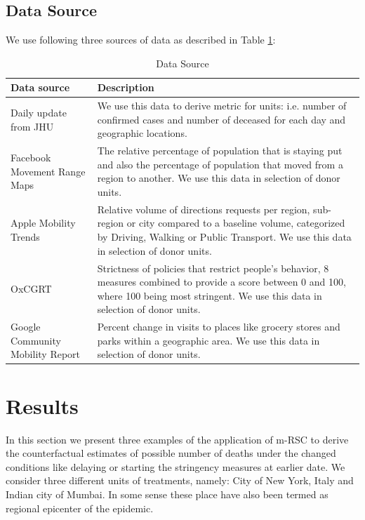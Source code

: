 \documentclass[preprint,authoryear,12pt]{elsarticle}
\begin{document}
	\subsection{Data Source}
	We use following three sources of data as described in Table \ref{Table1}:
	
	\begin{table}[h!]
		\centering
		\begin{tabularx}{0.9\textwidth}[t]{p{}X}
			\hline
			\textbf{Data source} &  \textbf{Description}\\ [0.5ex]
			\hline\hline
			Daily update from JHU  \cite{DDG2020}  & We use this data to derive metric for units: i.e. number of confirmed cases and number of deceased for each day and geographic locations.\\ [1ex]
			\hline
			Facebook Movement Range Maps \cite{JM2020} & The relative percentage of population that is staying put and also the percentage of population that moved from a region to another. We use this data in selection of donor units.\\
			\hline
			Apple Mobility Trends\cite{Apple2020} & Relative volume of directions requests per region, sub-region or city compared to a baseline volume, categorized by Driving, Walking or Public Transport. We use this data in selection of donor units.\\
			\hline
			OxCGRT  \cite{HWP2020} &  Strictness of policies that restrict people’s behavior, 8 measures combined to provide a score between 0 and 100, where 100 being most stringent. We use this data in selection of donor units.\\
			\hline
			Google Community Mobility Report \cite{Goog2020} &  Percent change in visits to places like grocery stores and parks within a geographic area. We use this data in selection of donor units.\\ [1ex] 
			\hline
		\end{tabularx}
		\caption{Data Source}
		\label{Table1}
	\end{table}
	 
\section{Results}
\label{SEC3}
In this section we present three examples of the application of m-RSC to derive the counterfactual estimates of possible number of deaths under the changed conditions like delaying or starting the stringency measures at earlier date. We consider three different units of treatments, namely: City of New York, Italy and Indian city of Mumbai. In some sense these place have also been termed as regional epicenter of  the epidemic.
\end{document}

